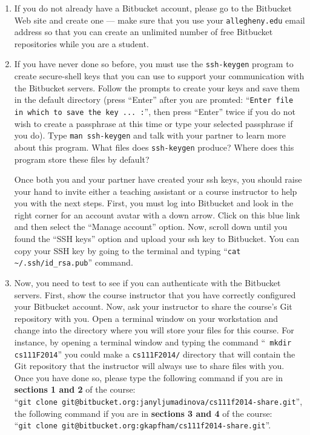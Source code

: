 \begin{enumerate}

  \item If you do not already have a Bitbucket account, please go to the Bitbucket Web site and create one --- 
    make sure that you use your {\tt allegheny.edu} email address so that you can create an unlimited number of free
    Bitbucket repositories while you are a student. 
    
  \item If you have never done so before, you must use the {\tt ssh-keygen} program to create secure-shell keys that you
    can use to support your communication with the Bitbucket servers. Follow the prompts to create your keys and save
    them in the default directory (press ``Enter'' after you are promted: ``{\tt Enter file in which to save the key ...
    :}'', then press ``Enter'' twice if you do not wish to create a passphrase at this time or type your selected
    passphrase if you do).   Type {\tt man ssh-keygen} and talk with your partner to learn more about this program.
    What files does {\tt ssh-keygen} produce?  Where does this program store these files by default?

    Once both you and your partner have created your ssh keys, you should raise your hand to invite either a teaching
    assistant or a course instructor to help you with the next steps. First, you must log into Bitbucket and look in the
    right corner for an account avatar with a down arrow.  Click on this blue link and then select the ``Manage
    account'' option. Now, scroll down until you found the ``SSH keys'' option and upload your ssh key to Bitbucket. You
    can copy your SSH key by going to the terminal and typing ``{\tt cat \textasciitilde{}/.ssh/id\_rsa.pub}'' command.

  \item Now, you need to test to see if you can authenticate with the Bitbucket servers.  First, show the course
    instructor that you have correctly configured your Bitbucket account.  Now, ask your instructor to share the
    course's Git repository with you.  Open a terminal window on your workstation and change into the directory where
    you will store your files for this course.  For instance, by opening a terminal window and typing the command ``{\tt
    mkdir cs111F2014}'' you could make a {\tt cs111F2014/} directory that will contain the Git repository that the
    instructor will always use to share files with you.  Once you have done so, please type the following command if you
    are in {\bf sections 1 and 2} of the course: \\ ``{\tt git clone
    git@bitbucket.org:janyljumadinova/cs111f2014-share.git}'',  the following command if you are in {\bf
    sections 3 and 4} of the course: \\``{\tt git clone git@bitbucket.org:gkapfham/cs111f2014-share.git}''.  


\end{enumerate}
